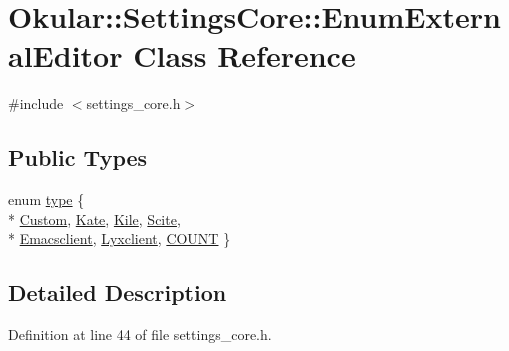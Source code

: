 \hypertarget{classOkular_1_1SettingsCore_1_1EnumExternalEditor}{\section{Okular\+:\+:Settings\+Core\+:\+:Enum\+External\+Editor Class Reference}
\label{classOkular_1_1SettingsCore_1_1EnumExternalEditor}
}


{\ttfamily \#include $<$settings\+\_\+core.\+h$>$}

\subsection*{Public Types}
\begin{DoxyCompactItemize}
\item 
enum \hyperlink{classOkular_1_1SettingsCore_1_1EnumExternalEditor_a933c39b8e6ad3e1646a01bfad4197614}{type} \{ \\*
\hyperlink{classOkular_1_1SettingsCore_1_1EnumExternalEditor_a933c39b8e6ad3e1646a01bfad4197614a4f06b8a20cffcebe6fc049c95b67a097}{Custom}, 
\hyperlink{classOkular_1_1SettingsCore_1_1EnumExternalEditor_a933c39b8e6ad3e1646a01bfad4197614a983e6f3a87bdf4fb13db73a52b85a77c}{Kate}, 
\hyperlink{classOkular_1_1SettingsCore_1_1EnumExternalEditor_a933c39b8e6ad3e1646a01bfad4197614a1d477ff44abbb63d4f15dab78ff4b3de}{Kile}, 
\hyperlink{classOkular_1_1SettingsCore_1_1EnumExternalEditor_a933c39b8e6ad3e1646a01bfad4197614add4987dec197014511ee39fd0771a3e1}{Scite}, 
\\*
\hyperlink{classOkular_1_1SettingsCore_1_1EnumExternalEditor_a933c39b8e6ad3e1646a01bfad4197614a9377d1e109f9cdab122ca1f843af5070}{Emacsclient}, 
\hyperlink{classOkular_1_1SettingsCore_1_1EnumExternalEditor_a933c39b8e6ad3e1646a01bfad4197614aadfda4e0041df3fcd5e9fce297489b73}{Lyxclient}, 
\hyperlink{classOkular_1_1SettingsCore_1_1EnumExternalEditor_a933c39b8e6ad3e1646a01bfad4197614a56c124e2b8ee18f265f8bb2665567e8a}{C\+O\+U\+N\+T}
 \}
\end{DoxyCompactItemize}


\subsection{Detailed Description}


Definition at line 44 of file settings\+\_\+core.\+h.



